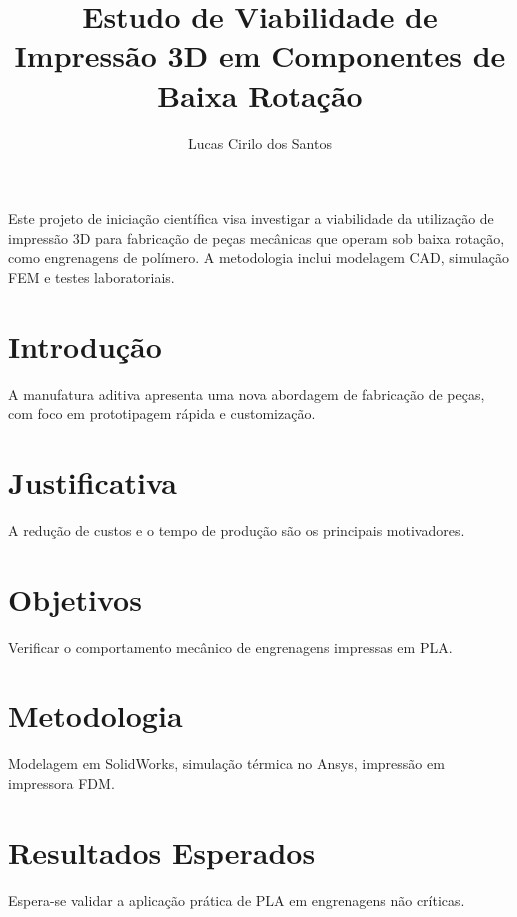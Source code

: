 \documentclass{abnt2025}
\title{Estudo de Viabilidade de Impressão 3D em Componentes de Baixa Rotação}
\author{Lucas Cirilo dos Santos}
\begin{document}
\maketitle

\begin{resumo}
Este projeto de iniciação científica visa investigar a viabilidade da utilização de impressão 3D para fabricação de peças mecânicas que operam sob baixa rotação, como engrenagens de polímero. A metodologia inclui modelagem CAD, simulação FEM e testes laboratoriais.
\end{resumo}


\section{Introdução}
A manufatura aditiva apresenta uma nova abordagem de fabricação de peças, com foco em prototipagem rápida e customização.

\section{Justificativa}
A redução de custos e o tempo de produção são os principais motivadores.

\section{Objetivos}
Verificar o comportamento mecânico de engrenagens impressas em PLA.

\section{Metodologia}
Modelagem em SolidWorks, simulação térmica no Ansys, impressão em impressora FDM.

\section{Resultados Esperados}
Espera-se validar a aplicação prática de PLA em engrenagens não críticas.



\end{document}
